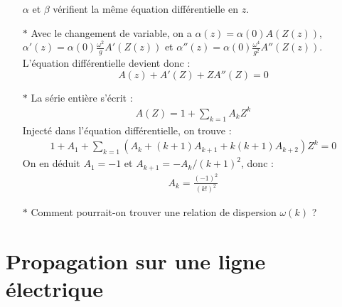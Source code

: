 \documentclass{report}
\begin{document}
\begin{itemize}
		$\alpha$ et $\beta$ vérifient la même équation différentielle en $z$.
		
		\item[$\ast$] Avec le changement de variable, on a $\alpha(z)=\alpha(0)A(Z(z))$, $\alpha'(z)=\alpha(0)\frac{\omega^2}{g}A'(Z(z))$ et $\alpha''(z)=\alpha(0)\frac{\omega^4}{g^2}A''(Z(z))$. L'équation différentielle devient donc :
		\begin{equation}
			A(z)+A'(Z)+ZA''(Z)=0
		\end{equation}
		
		\item[$\ast$] La série entière s'écrit :
		\begin{align*}
			A(Z) = 1+\sum_{k=1} A_kZ^k
		\end{align*}
		Injecté dans l'équation différentielle, on trouve :
	\begin{align*}
		1+A_1+\sum_{k=1}(A_k+(k+1)A_{k+1}+k(k+1)A_{k+2})Z^k=0
	\end{align*}		
	On en déduit $A_1=-1$ et $A_{k+1}=-A_k/(k+1)^2$, donc :
	\begin{align*}
		A_k=\frac{(-1)^2}{(k!)^2}
	\end{align*}		
		
		\item[$\ast$] Comment pourrait-on trouver une relation de dispersion $\omega(k)$ ?
		
\end{itemize}

\section*{Propagation sur une ligne électrique}
\end{document}

